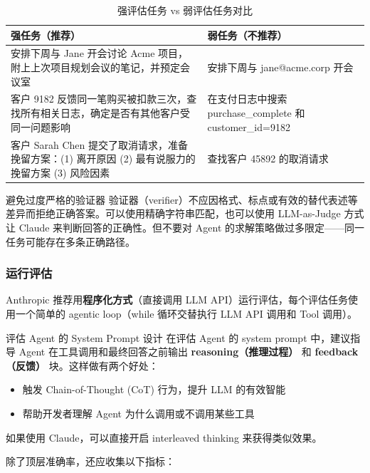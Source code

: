 \begin{table}[H]
\centering
\caption{强评估任务 vs 弱评估任务对比}
\begin{tabular}{p{}p{}}
\toprule
\textbf{强任务（推荐）} & \textbf{弱任务（不推荐）} \\
\midrule
安排下周与 Jane 开会讨论 Acme 项目，附上上次项目规划会议的笔记，并预定会议室 & 安排下周与 jane@acme.corp 开会 \\
\midrule
客户 9182 反馈同一笔购买被扣款三次，查找所有相关日志，确定是否有其他客户受同一问题影响 & 在支付日志中搜索 purchase\_complete 和 customer\_id=9182 \\
\midrule
客户 Sarah Chen 提交了取消请求，准备挽留方案：(1) 离开原因 (2) 最有说服力的挽留方案 (3) 风险因素 & 查找客户 45892 的取消请求 \\
\bottomrule
\end{tabular}
\end{table}

\begin{warningbox}{避免过度严格的验证器}
验证器（verifier）不应因格式、标点或有效的替代表述等差异而拒绝正确答案。可以使用精确字符串匹配，也可以使用 LLM-as-Judge 方式让 Claude 来判断回答的正确性。但不要对 Agent 的求解策略做过多限定——同一任务可能存在多条正确路径。
\end{warningbox}

\subsubsection{运行评估}

Anthropic 推荐用\textbf{程序化方式}（直接调用 LLM API）运行评估，每个评估任务使用一个简单的 agentic loop（while 循环交替执行 LLM API 调用和 Tool 调用）。

\begin{importantbox}{评估 Agent 的 System Prompt 设计}
在评估 Agent 的 system prompt 中，建议指导 Agent 在工具调用和最终回答之前输出 \textbf{reasoning（推理过程）} 和 \textbf{feedback（反馈）} 块。这样做有两个好处：
\begin{itemize}[leftmargin=1.5em]
    \item 触发 Chain-of-Thought (CoT) 行为，提升 LLM 的有效智能
    \item 帮助开发者理解 Agent 为什么调用或不调用某些工具
\end{itemize}
如果使用 Claude，可以直接开启 interleaved thinking 来获得类似效果。
\end{importantbox}

除了顶层准确率，还应收集以下指标：

